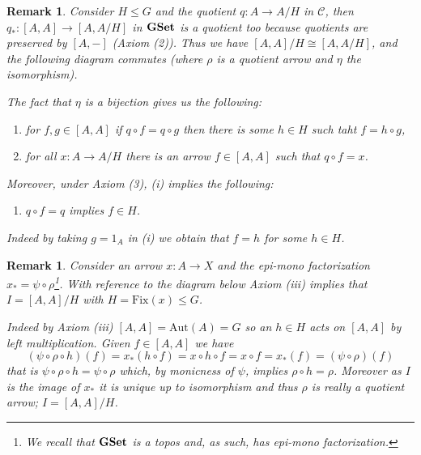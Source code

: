\documentclass[italian, 12pt, reqno]{article}
\theoremstyle{myteo}
\newtheorem{remark}[theorem]{Remark}
\numberwithin{equation}{section}
\newcommand{\cat}[1]{\mathscr{#1}}
\newcommand{\aut}{\text{Aut}}
\newcommand{\gset}{\text{\textbf{GSet}}}
\newcommand{\fix}[1]{\text{Fix}(#1)}
\newcommand{\homs}[2]{[#1, #2]}
\newcommand{\fun}[3]{#1\colon#2\to #3}
\begin{document}
\begin{remark}
  \label{rem:axiom1}
  Consider \(H\leq G\) and the quotient \(\fun{q}{A}{A/H}\) in \(\cat{C}\), then \(\fun{q_*}{\homs{A}{A}}{\homs{A}{A/H}}\) in \(\gset\) is a quotient too because quotients are preserved by \(\homs{A}{-}\) (Axiom (2)).
  Thus we have \(\homs{A}{A}/H \cong \homs{A}{A/H}\), and the following diagram commutes (where \(\rho\) is a quotient arrow and \(\eta\) the isomorphism).

  \begin{figure}
    \begin{center}
    \end{center}
    \caption{}
    \label{diagram:eta}
  \end{figure}

  The fact that \(\eta\) is a bijection gives us the following:
  \begin{enumerate}
  \item[(i)] for \(f, g\in \homs{A}{A}\) if \(q\circ f = q\circ g\) then there is some \(h\in H\) such taht \(f = h\circ g\),
  \item[(ii)] for all \(\fun{x}{A}{A/H}\) there is an arrow \(f\in\homs{A}{A}\) such that \(q\circ f = x\).
  \end{enumerate}
  Moreover, under Axiom (3), (i) implies the following:
  \begin{enumerate}
  \item[(iii)] \(q\circ f = q\) implies \(f\in H\).
  \end{enumerate}
  Indeed by taking \(g = 1_A\) in (i) we obtain that \(f = h\) for some \(h\in H\).
\end{remark}

\begin{remark}
  \label{rem:axiom2}
  Consider an arrow \(\fun{x}{A}{X}\) and the epi-mono factorization \(x_* = \psi\circ \rho\)\footnote{We recall that \(\gset\) is a topos and, as such, has epi-mono factorization.}.
  With reference to the diagram below Axiom (iii) implies that \(I = \homs{A}{A}/H\) with \(H = \fix{x}\leq G\).

  \begin{center}
  \end{center}

  Indeed by Axiom (iii) \(\homs{A}{A} = \aut(A) = G\) so an \(h\in H\) acts on \(\homs{A}{A}\) by left multiplication.
  Given \(f\in\homs{A}{A}\) we have
  \[(\psi\circ \rho\circ h)(f) = x_*(h\circ f) = x\circ h\circ f = x\circ f = x_*(f) = (\psi\circ \rho)(f)\]
  that is \(\psi\circ\rho\circ h = \psi\circ\rho\) which, by monicness of \(\psi\), implies \(\rho\circ h = \rho\).
  Moreover as \(I\) is the image of \(x_*\) it is unique up to isomorphism and thus \(\rho\) is really a quotient arrow; \(I = \homs{A}{A}/H\).
\end{remark}
\end{document}

